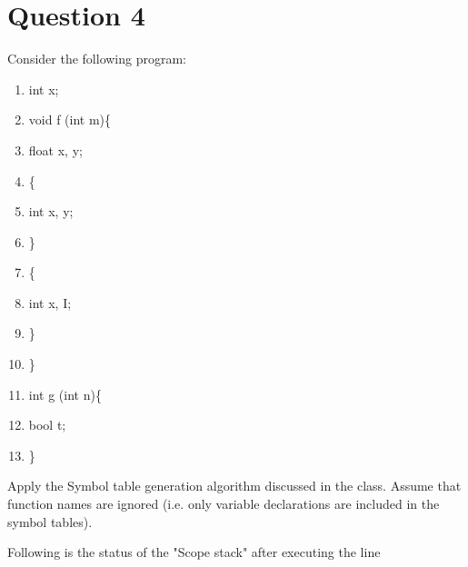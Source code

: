 \documentclass{article}
\newlength\tindent
\renewcommand{\indent}{\hspace*{\tindent}}
\begin{document}
\newpage
\section*{Question 4}
Consider the following program:
\begin{enumerate}
  \item int x;
  \item void f (int m)\{
  \item \indent float x, y;
  \item \indent \{
  \item \indent\indent int x, y;
  \item \indent \}
  \item \indent \{
  \item \indent\indent int x, I;
  \item \indent \}
  \item \}
  \item int g (int n)\{
  \item \indent bool t;
  \item \}
\end{enumerate}
Apply the Symbol table generation algorithm discussed in the class. Assume that function names are ignored (i.e. only variable declarations are included in the symbol tables).

Following is the status of the "Scope stack" after executing the line 
\end{document}
